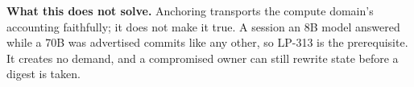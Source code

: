\documentclass[10pt,a4paper]{article}
\begin{document}
\vspace{0.35ex}
\noindent\textbf{What this does not solve.}
Anchoring transports the compute domain's accounting faithfully; it does not make it true. A session
an 8B model answered while a 70B was advertised commits like any other, so LP-313 is the
prerequisite. It creates no demand, and a compromised owner can still rewrite state before a digest
is taken.

\vspace{0.4ex}
\end{document}

